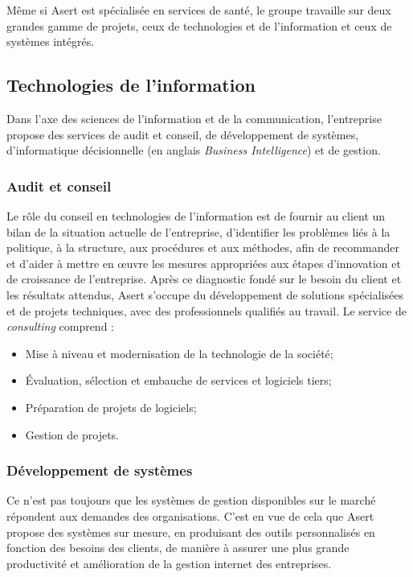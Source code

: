 Même si Asert est spécialisée en services de santé, le groupe travaille  sur deux grandes gamme de projets, ceux de technologies et de l'information et ceux de systèmes intégrés. 

\subsection{Technologies de l'information}

Dans l'axe des sciences de l'information et de la communication, l'entreprise propose des services de audit et conseil, de développement de systèmes, d'informatique décisionnelle (en anglais \textit{Business Intelligence}) et de gestion.

\subsubsection{Audit et conseil}

Le rôle du conseil en technologies de l'information est de fournir au client un bilan de la situation actuelle de l'entreprise, d'identifier les problèmes liés à la politique, à la structure, aux procédures et aux méthodes, afin de recommander et d'aider à mettre en \oe{}uvre les mesures appropriées aux étapes d'innovation et de croissance de l'entreprise. Après ce diagnostic fondé sur le besoin du client et les résultats attendus, Asert s'occupe du développement de solutions spécialisées et de projets techniques, avec des professionnels qualifiés au travail. Le service de \textit{consulting} comprend :

\begin{itemize}
\item Mise à niveau et modernisation de la technologie de la société;
\item Évaluation, sélection et embauche de services et logiciels tiers;
\item Préparation de projets de logiciels;
\item Gestion de projets.
\end{itemize}

\subsubsection{Développement de systèmes}

Ce n'est pas toujours que les systèmes de gestion disponibles sur le marché répondent aux demandes des organisations. C'est en vue de cela que Asert propose des systèmes sur mesure, en produisant des outils personnalisés en fonction des besoins des clients, de manière à assurer une plus grande productivité et amélioration de la gestion internet des entreprises.

